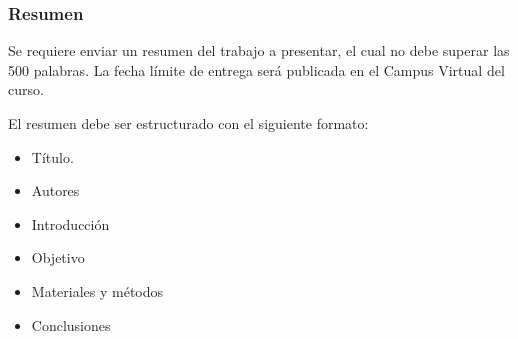 \subsubsection{Resumen}

Se requiere enviar un resumen del trabajo a presentar, el cual no debe superar las 500 palabras. 
La fecha límite de entrega será publicada en el Campus Virtual del curso.

El resumen debe ser estructurado con el siguiente formato:

\begin{itemize}
    \item Título.
    \item Autores
    \item Introducción
    \item Objetivo
    \item Materiales y métodos
    \item Conclusiones
\end{itemize}
